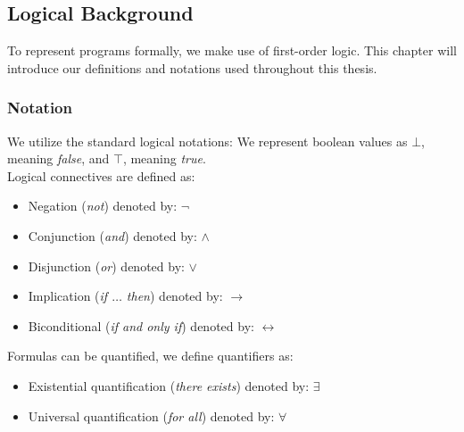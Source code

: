 \subsection{Logical Background}
To represent programs formally, we make use of first-order logic. This chapter will introduce our definitions and notations used throughout this thesis.

\subsubsection{Notation}
We utilize the standard logical notations: We represent boolean values as $\bot$, meaning \textsl{false}, and $\top$, meaning \textsl{true}. \\ Logical connectives are defined as:
\begin{itemize}
	\item Negation (\textsl{not}) denoted by: $\neg$
	\item Conjunction (\textsl{and}) denoted by: $\land$
	\item Disjunction (\textsl{or}) denoted by: $\lor$
	\item Implication (\textsl{if $\ldots$ then}) denoted by: $\rightarrow$
	\item Biconditional (\textsl{if and only if}) denoted by: $\leftrightarrow$
\end{itemize}
Formulas can be quantified, we define quantifiers as:
\begin{itemize}
	\item Existential quantification (\textsl{there exists}) denoted by: $\exists$
	\item Universal quantification (\textsl{for all}) denoted by: $\forall$
\end{itemize}

